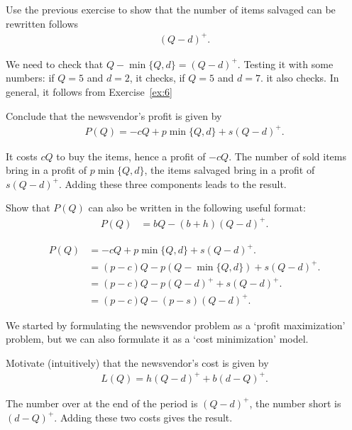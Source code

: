 \begin{exercise}
Use the previous exercise to show that the number of items salvaged can be rewritten 
follows
\begin{align*}
(Q-d)^+.
\end{align*}
\begin{solution}
We need to check that $Q-\min\{Q,d\} = (Q-d)^+$. Testing it with some numbers: if $Q=5$ and $d=2$, it checks, if $Q=5$ and $d=7$. it also checks. In general, it follows from Exercise~\ref{ex:6} 
\end{solution}
\end{exercise}



\begin{exercise}
Conclude that  the newsvendor's profit is given by
\begin{align*}
P(Q) = -c Q + p\min\{Q,d\} + s(Q-d)^+.
\end{align*}
\begin{solution}
  It costs $c Q$ to buy the items, hence a profit of $-c Q$. The number of sold items bring in a profit of $p\min\{Q, d\}$, the items salvaged bring in a profit of $s(Q-d)^+$. Adding these three components leads to the result.
\end{solution}
\end{exercise}

\begin{exercise}
Show that $P(Q)$ can also be written in the following useful format:
\begin{align}\label{eq:27}
P(Q) 
&= b Q - (b+h)(Q-d)^+.
\end{align}
\begin{solution}
  \begin{align*}
P(Q) 
&= -c Q + p\min\{Q,d\} + s(Q-d)^+.\\
&= (p-c)Q - p(Q-\min\{Q,d\}) + s(Q-d)^+.\\
&= (p-c)Q - p(Q-d)^+ + s(Q-d)^+.\\
&= (p-c)Q - (p-s)(Q-d)^+.
  \end{align*}
\end{solution}
\end{exercise}


We started by formulating the newsvendor problem as a `profit maximization' problem, but we can also formulate it as a `cost minimization' model. 

\begin{exercise}
Motivate (intuitively) that  the newsvendor's cost is given by 
\begin{align}\label{eq:23}
L(Q) = h(Q-d)^+ + b(d-Q)^+.
\end{align}
\begin{solution}
The number over at the end of the period is $(Q-d)^+$, the number short is $(d-Q)^+$. Adding these two costs gives the result.  
\end{solution}
\end{exercise}

